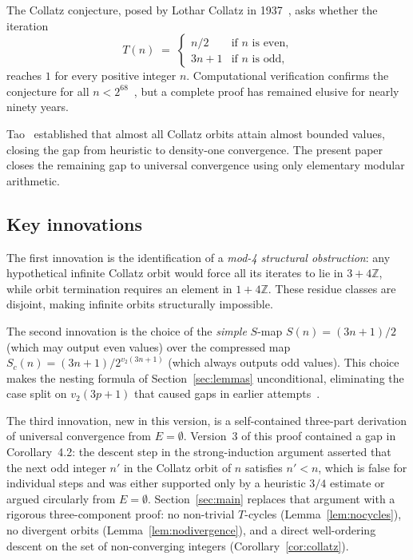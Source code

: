 \documentclass{amsart}
\theoremstyle{definition}
\theoremstyle{remark}
\newcommand{\Z}{\mathbb{Z}}
\newcommand{\vv}[1]{v_2\!\left(#1\right)}   %
\newcommand{\Sc}{S_c}                         %
\newcommand{\Tmap}{T}                         %
\begin{document}
The Collatz conjecture, posed by Lothar Collatz in 1937~\cite{Collatz1937},
asks whether the iteration
\[
  \Tmap(n) \;=\;
  \begin{cases}
    n/2      & \text{if } n \text{ is even,}\\
    3n+1     & \text{if } n \text{ is odd,}
  \end{cases}
\]
reaches $1$ for every positive integer $n$.
Computational verification confirms the conjecture for all
$n < 2^{68}$~\cite{Roosendaal}, but a complete proof has remained elusive
for nearly ninety years.

Tao~\cite{Tao2019} established that almost all Collatz orbits attain almost
bounded values, closing the gap from heuristic to density-one convergence.
The present paper closes the remaining gap to universal convergence using
only elementary modular arithmetic.

\subsection*{Key innovations}

The first innovation is the identification of a \emph{mod-4 structural
obstruction}: any hypothetical infinite Collatz orbit would force all its
iterates to lie in $3+4\Z$, while orbit termination requires an element in
$1+4\Z$.
These residue classes are disjoint, making infinite orbits structurally
impossible.

The second innovation is the choice of the \emph{simple} $S$-map
$S(n)=(3n+1)/2$ (which may output even values) over the compressed map
$\Sc(n)=(3n+1)/2^{\vv{3n+1}}$ (which always outputs odd values).
This choice makes the nesting formula of Section~\ref{sec:lemmas}
unconditional, eliminating the case split on $\vv{3p+1}$ that caused gaps
in earlier attempts~\cite{Wakil2025a,Wakil2025b,Wakil2025c}.

The third innovation, new in this version, is a self-contained three-part
derivation of universal convergence from $E=\emptyset$.
Version~3 of this proof contained a gap in Corollary~4.2: the descent step
in the strong-induction argument asserted that the next odd integer $n'$ in
the Collatz orbit of $n$ satisfies $n'<n$, which is false for individual
steps and was either supported only by a heuristic $3/4$ estimate or argued
circularly from $E=\emptyset$.
Section~\ref{sec:main} replaces that argument with a rigorous three-component
proof: no non-trivial $T$-cycles (Lemma~\ref{lem:nocycles}), no divergent
orbits (Lemma~\ref{lem:nodivergence}), and a direct well-ordering descent on
the set of non-converging integers (Corollary~\ref{cor:collatz}).
\end{document}

